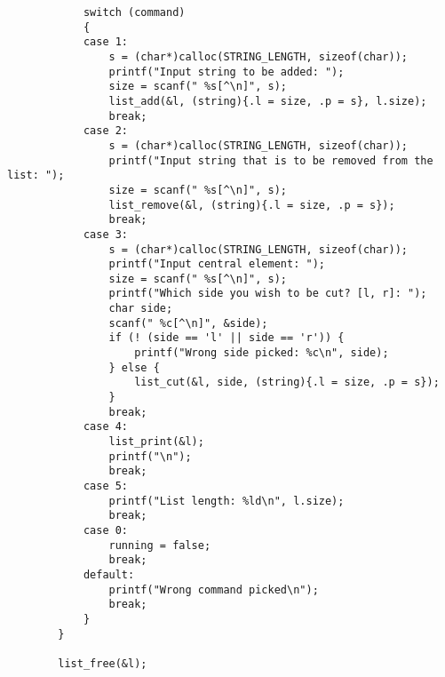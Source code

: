 \documentclass[a4paper]{article}
\newcounter{i}
\begin{document}
\begin{enumerate}[label=\textbf{\arabic*}.]
\begin{verbatim}
            switch (command)
            {
            case 1:
                s = (char*)calloc(STRING_LENGTH, sizeof(char));
                printf("Input string to be added: ");
                size = scanf(" %s[^\n]", s);
                list_add(&l, (string){.l = size, .p = s}, l.size);
                break;
            case 2:
                s = (char*)calloc(STRING_LENGTH, sizeof(char));
                printf("Input string that is to be removed from the list: ");
                size = scanf(" %s[^\n]", s);
                list_remove(&l, (string){.l = size, .p = s});
                break;
            case 3:
                s = (char*)calloc(STRING_LENGTH, sizeof(char));
                printf("Input central element: ");
                size = scanf(" %s[^\n]", s);
                printf("Which side you wish to be cut? [l, r]: ");
                char side;
                scanf(" %c[^\n]", &side);
                if (! (side == 'l' || side == 'r')) {
                    printf("Wrong side picked: %c\n", side);
                } else {
                    list_cut(&l, side, (string){.l = size, .p = s});
                }
                break;
            case 4:
                list_print(&l);
                printf("\n");
                break;
            case 5:
                printf("List length: %ld\n", l.size);
                break;
            case 0:
                running = false;
                break;
            default:
                printf("Wrong command picked\n");
                break;
            }
        }
    
        list_free(&l);
    

\end{verbatim}
\end{enumerate}
\end{document}
